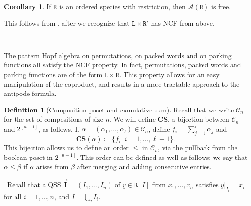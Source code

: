 \documentclass[12pt, reqno]{amsart}
\theoremstyle{definition}
\newtheorem{cor}[thm]{Corollary}
\newtheorem{defin}[thm]{Definition}
\newcommand{\III}{\vec{\mathbf{I}}}
\begin{document}
\begin{cor}\label{cor:freeNCF}
If $\mathtt{R}$ is an ordered species with restriction, then $\mathcal A(\mathtt{R})$ is free.
\end{cor}
This follows from \cite{Vargas}, after we recognize that $\mathtt{L} \times \mathtt{R}'$ has NCF from above.

\

The pattern Hopf algebra on permutations, on packed words and on parking functions all satisfy the NCF property.
In fact, permutations, packed words and parking functions are of the form $\mathtt{L} \times \mathtt{R}$.
This property allows for an easy manipulation of the coproduct, and results in a more tractable approach to the antipode formula.

\begin{defin}[Composition poset and cumulative sum]
Recall that we write $\mathcal C_n$ for the set of compositions of size $n$.
We will define $\mathbf{CS}$, a bijection between $\mathcal C_n $ and $2^{[n-1]}$, as follows.
If $\alpha =(\alpha_1, \dots, \alpha_{\ell} ) \in \mathcal C_n$, define $f_i = \sum_{j=1}^i \alpha_j$ and 
\begin{equation}
    \mathbf{CS}(\alpha) \coloneqq \{f_i\, | \, i = 1, \dots, \ell - 1\} \, .
\end{equation}
This bijection allows us to define an order $\leq $ in $\mathcal C_n$, via the pullback from the boolean poset in $2^{[n-1]}$.
This order can be defined as well as follows: we say that $\alpha \leq \beta$ if $\alpha$ arises from $\beta $ after merging and adding consecutive entries.
\end{defin}

\
Recall that a QSS $\III = (I_1, \dots , I_n)$ of $y\in \mathtt{R}[I]$ from $x_1, \dots, x_n$ satisfies $y|_{I_i} = x_i$ for all $i = 1, \dots , n$, and $I = \bigcup_i I_i$.
\end{document}
